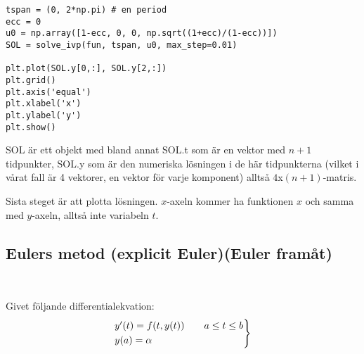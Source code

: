 \begin{verbatim}
tspan = (0, 2*np.pi) # en period
ecc = 0
u0 = np.array([1-ecc, 0, 0, np.sqrt((1+ecc)/(1-ecc))])
SOL = solve_ivp(fun, tspan, u0, max_step=0.01)

plt.plot(SOL.y[0,:], SOL.y[2,:])
plt.grid()
plt.axis('equal')
plt.xlabel('x')
plt.ylabel('y')
plt.show()
\end{verbatim}
\par\bigskip
\noindent SOL är ett objekt med bland annat SOL.t som är en vektor med $n+1$ tidpunkter, SOL.y som är den numeriska lösningen i de här tidpunkterna (vilket i vårat fall är 4 vektorer, en vektor för varje komponent) alltså $4$x$(n+1)$-matris.
\par\bigskip
\noindent Sista steget är att plotta lösningen. $x$-axeln kommer ha funktionen $x$ och samma med $y$-axeln, alltså inte variabeln $t$.
\par\bigskip
\subsection{Eulers metod (explicit Euler)(Euler framåt)}\hfill\\
\par\bigskip
\noindent Givet följande differentialekvation:
\begin{equation*}
  \begin{gathered}
    \begin{rcases*}
      y^{\prime}(t)=f(t,y(t))\qquad a\leq t\leq b\\
      y(a)=\alpha
    \end{rcases*}
  \end{gathered}
\end{equation*}
\par\bigskip

